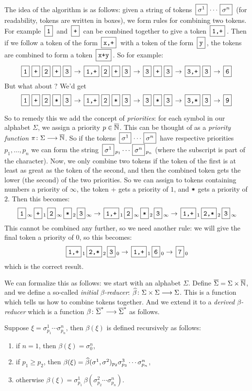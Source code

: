 \documentclass{llncs}
\newcounter{algo}
\begin{document}
The idea of the algorithm is as follows: given a string of tokens $\mb{\sigma^1}\cdots\mb{\sigma^n}$ (for readability, tokens are written in boxes), we form rules for combining two tokens.
For example $\mb{\ttt1}$ and $\mb{\ttt+}$ can be combined together to give a token $\mb{\ttt{1,+}}$.
Then if we follow a token of the form $\mb{\ttt{x,+}}$ with a token of the form $\mb{\ttt y}$, the tokens are combined to form a token $\mb{\ttt{x+y}}$.
So for example:
\[ \mbt{1} \mbt{+} \mbt{2} \mbt{+} \mbt{3} \to \mbt{1,+} \mbt2 \mbt+ \mbt3 \to \mbt{3} \mbt+ \mbt3 \to \mbt{3,+} \mbt3 \to \mbt6 \]
But what about ?
We'd get
\[ \mbt1 \mbt+ \mbt2 \mbt* \mbt3 \to \mbt{1,+} \mbt2 \mbt* \mbt3 \to \mbt3 \mbt* \mbt3 \to \mbt{3,*} \mbt3 \to \mbt9 \]

So to remedy this we add the concept of \textit{priorities}: for each symbol in our alphabet $\Sigma$, we assign a priority $p\in\overline{\mathbb N}$.
This can be thought of as a \textit{priority function} $\pi\colon\Sigma\longrightarrow\overline{\mathbb N}$.
So if the tokens $\mb{\sigma^1}\cdots\mb{\sigma^n}$ have respective priorities $p_1,\dots,p_n$ we can form the string $\mb{\sigma^1}_{p_1}\cdots\mb{\sigma^n}_{p_n}$ (where the subscript is part of the
character).
Now, we only combine two tokens if the token of the first is at least as great as the token of the second, and then the combined token gets the lower (the second) of the two priorities.
So we can assign to tokens containing numbers a priority of $\infty$, the token \ttt+ gets a priority of $1$, and $\texttt*$ gets a priority of $2$.
Then this becomes:
\[ \mbt1_\infty \mbt+_1 \mbt2_\infty \mbt*_2 \mbt3_\infty \to \mbt{1,+}_1 \mbt2_\infty \mbt*_2 \mbt3_\infty \to \mbt{1,+}_1 \mbt{2,*}_2 \mbt3_\infty \]
This cannot be combined any further, so we need another rule: we will give the final token a priority of $0$, so this becomes:
\[ \mbt{1,+}_1 \mbt{2,*}_2 \mbt3_0 \to \mbt{1,+}_1 \mbt{6}_0 \to \mbt{7}_0 \]
which is the correct result.

We can formalize this as follows: we start with an alphabet $\Sigma$.
Define $\overline\Sigma=\Sigma\times\overline{\mathbb N}$, and we define a so-called \textit{initial $\beta$-reducer}: $\widehat\beta\colon \Sigma\times\Sigma \longrightarrow \Sigma$.
This is a function which tells us how to combine tokens together.
And we extend it to a \textit{derived $\beta$-reducer} which is a function $\beta\colon\overline\Sigma^*\longrightarrow\overline\Sigma^*$ as follows.

Suppose $\xi=\sigma^1_{p_1}\cdots\sigma^n_{p_n}$, then $\beta(\xi)$ is defined recursively as follows:
\begin{enumerate}
    \item if $n=1$, then $\beta(\xi)=\sigma^n_0$,
    \item if $p_1\geq p_2$, then $\beta(\xi)=\widehat\beta(\sigma^1,\sigma^2)_{p_2}\sigma^3_{p_3}\cdots\sigma^n_{p_n}$,
    \item otherwise $\beta(\xi)=\sigma^1_{p_1}\,\beta(\sigma^2_{p_2}\cdots\sigma^n_{p_n})$.
\end{enumerate}
\end{document}

